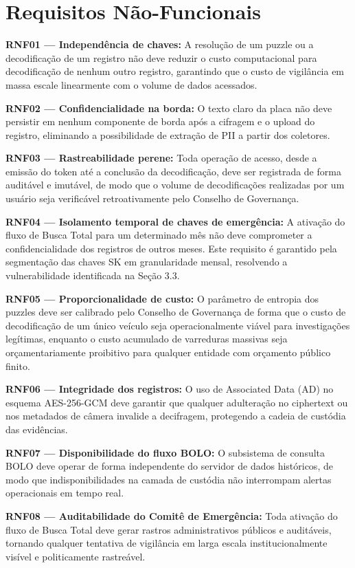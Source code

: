 \section{Requisitos Não-Funcionais}
\noindent\textbf{RNF01 — Independência de chaves:} A resolução de um puzzle ou a decodificação de um registro não deve reduzir o custo computacional para decodificação de nenhum outro registro, garantindo que o custo de vigilância em massa escale linearmente com o volume de dados acessados.

\noindent\textbf{RNF02 — Confidencialidade na borda:} O texto claro da placa não deve persistir em nenhum componente de borda após a cifragem e o upload do registro, eliminando a possibilidade de extração de PII a partir dos coletores.

\noindent\textbf{RNF03 — Rastreabilidade perene:} Toda operação de acesso, desde a emissão do token até a conclusão da decodificação, deve ser registrada de forma auditável e imutável, de modo que o volume de decodificações realizadas por um usuário seja verificável retroativamente pelo Conselho de Governança.

\noindent\textbf{RNF04 — Isolamento temporal de chaves de emergência:} A ativação do fluxo de Busca Total para um determinado mês não deve comprometer a confidencialidade dos registros de outros meses. Este requisito é garantido pela segmentação das chaves SK em granularidade mensal, resolvendo a vulnerabilidade identificada na Seção 3.3.

\noindent\textbf{RNF05 — Proporcionalidade de custo:} O parâmetro de entropia dos puzzles deve ser calibrado pelo Conselho de Governança de forma que o custo de decodificação de um único veículo seja operacionalmente viável para investigações legítimas, enquanto o custo acumulado de varreduras massivas seja orçamentariamente proibitivo para qualquer entidade com orçamento público finito.

\noindent\textbf{RNF06 — Integridade dos registros:} O uso de Associated Data (AD) no esquema AES-256-GCM deve garantir que qualquer adulteração no ciphertext ou nos metadados de câmera invalide a decifragem, protegendo a cadeia de custódia das evidências.

\noindent\textbf{RNF07 — Disponibilidade do fluxo BOLO:} O subsistema de consulta BOLO deve operar de forma independente do servidor de dados históricos, de modo que indisponibilidades na camada de custódia não interrompam alertas operacionais em tempo real.

\noindent\textbf{RNF08 — Auditabilidade do Comitê de Emergência:} Toda ativação do fluxo de Busca Total deve gerar rastros administrativos públicos e auditáveis, tornando qualquer tentativa de vigilância em larga escala institucionalmente visível e politicamente rastreável.
